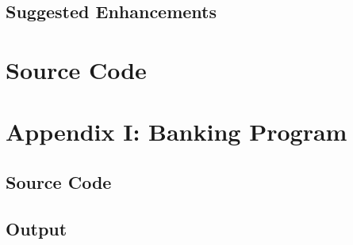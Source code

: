 \documentclass{report}
\begin{document}
        \section{Suggested Enhancements}
    
    \chapter{Source Code}

\chapter*{Appendix I: Banking Program}
\section{Source Code}
\section{Output}
\end{document}
